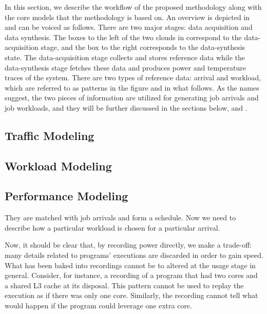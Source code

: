 
In this section, we describe the workflow of the proposed methodology along with
the core models that the methodology is based on. An overview is depicted in
 and can be voiced as follows. There are two major stages:
data acquisition and data synthesis. The boxes to the left of the two clouds in
 correspond to the data-acquisition stage, and the box to the
right corresponds to the data-synthesis state. The data-acquisition stage
collects and stores reference data while the data-synthesis stage fetches these
data and produces power and temperature traces of the system. There are two
types of reference data: arrival and workload, which are referred to as patterns
in the figure and in what follows. As the names suggest, the two pieces of
information are utilized for generating job arrivals and job workloads, and they
will be further discussed in the sections below,  and
.

\subsection{Traffic Modeling} 


\subsection{Workload Modeling} 


\subsection{Performance Modeling} 
They are matched with job arrivals and form a schedule. Now we need to describe
how a particular workload is chosen for a particular arrival.

Now, it should be clear that, by recording power directly, we make a trade-off:
many details related to programs' executions are discarded in order to gain
speed. What has been baked into recordings cannot be to altered at the usage
stage in general. Consider, for instance, a recording of a program that had two
cores and a shared L3 cache at its disposal. This pattern cannot be used to
replay the execution as if there was only one core. Similarly, the recording
cannot tell what would happen if the program could leverage one extra core.
